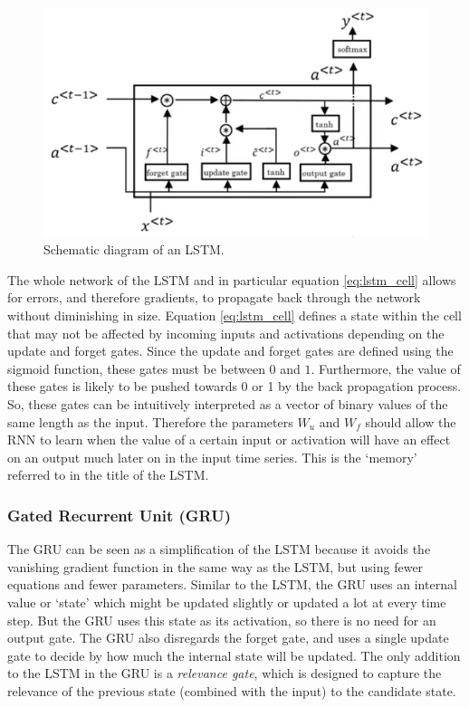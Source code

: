 \documentclass[a4paper,12pt]{article}
\theoremstyle{definition}
\begin{document}
\begin{figure}[ht]
	\centering
	\includegraphics{figures/lstm.png}
	\caption{Schematic diagram of an LSTM.}
	\label{fig:lstm}
\end{figure}

The whole network of the LSTM and in particular equation \ref{eq:lstm_cell} allows for errors, and therefore gradients, to propagate back through the network without diminishing in size. Equation \ref{eq:lstm_cell} defines a state within the cell that may not be affected by incoming inputs and activations depending on the update and forget gates. Since the update and forget gates are defined using the sigmoid function, these gates must be between $0$ and $1$. Furthermore, the value of these gates is likely to be pushed towards 0 or 1 by the back propagation process. So, these gates can be intuitively interpreted as a vector of binary values of the same length as the input. Therefore the parameters $W_u$ and $W_f$ should allow the RNN to learn when the value of a certain input or activation will have an effect on an output much later on in the input time series. This is the `memory' referred to in the title of the LSTM.

\subsubsection{Gated Recurrent Unit (GRU)\cite{cho, chung}}
The GRU can be seen as a simplification of the LSTM because it avoids the vanishing gradient function in the same way as the LSTM, but using fewer equations and fewer parameters. Similar to the LSTM, the GRU uses an internal value or `state' which might be updated slightly or updated a lot at every time step. But the GRU uses this state as its activation, so there is no need for an output gate. The GRU also disregards the forget gate, and uses a single update gate to decide by how much the internal state will be updated. The only addition to the LSTM in the GRU is a \textit{relevance gate}, which is designed to capture the relevance of the previous state (combined with the input) to the candidate state.
\end{document}
